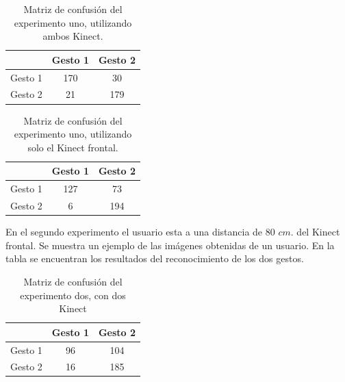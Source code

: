 \begin{table}[h!] 
\begin{center}
\begin{tabular}{ r || c | c |} 
 
        & Gesto 1 & Gesto 2 \\ \hline \hline  
Gesto 1 & 170  &  30  \\ \hline  
Gesto 2 & 21   & 179 \\   

\end{tabular}
\end{center} 
\caption{Matriz de confusión del experimento uno, utilizando ambos Kinect.}
\end{table}

\begin{table}[h!] 
\begin{center}
\begin{tabular}{ r || c | c |} 
 
        & Gesto 1 & Gesto 2 \\ \hline \hline  
Gesto 1 & 127  &  73  \\ \hline  
Gesto 2 & 6    &  194 \\   

\end{tabular}
\end{center} 
\caption{Matriz de confusión del experimento uno, utilizando solo el Kinect frontal.}
\end{table}

En el segundo experimento el usuario esta a una distancia de $80$ $cm.$ del Kinect frontal. Se muestra un ejemplo de las imágenes obtenidas de un usuario. En la tabla se encuentran los resultados del reconocimiento de los dos gestos.   


\begin{table}[h!] 
\begin{center}
\begin{tabular}{ r || c | c |} 
 
        & Gesto 1 & Gesto 2 \\ \hline \hline  
Gesto 1 & 96     &  104     \\ \hline  
Gesto 2 & 16     & 185     \\   

\end{tabular}
\end{center} 
\caption{Matriz de confusión del experimento dos, con dos Kinect} 
\end{table}

